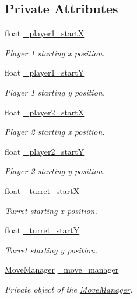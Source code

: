 \subsection*{Private Attributes}
\begin{DoxyCompactItemize}
\item 
float \hyperlink{classGame_ac3d9582803715a82b0aa03ddc9d9b7f6}{\-\_\-player1\-\_\-start\-X}
\begin{DoxyCompactList}\small\item\em Player 1 starting x position. \end{DoxyCompactList}\item 
float \hyperlink{classGame_ac86e7845910feac197a8396c9eedcae9}{\-\_\-player1\-\_\-start\-Y}
\begin{DoxyCompactList}\small\item\em Player 1 starting y position. \end{DoxyCompactList}\item 
float \hyperlink{classGame_ac3fb65efc81597149ea1c6951110f1b8}{\-\_\-player2\-\_\-start\-X}
\begin{DoxyCompactList}\small\item\em Player 2 starting x position. \end{DoxyCompactList}\item 
float \hyperlink{classGame_a62232949f4969880bad54622e180d9aa}{\-\_\-player2\-\_\-start\-Y}
\begin{DoxyCompactList}\small\item\em Player 2 starting y position. \end{DoxyCompactList}\item 
float \hyperlink{classGame_ad7a148e2de0c944863d8aaa78a075f74}{\-\_\-turret\-\_\-start\-X}
\begin{DoxyCompactList}\small\item\em \hyperlink{classTurret}{Turret} starting x position. \end{DoxyCompactList}\item 
float \hyperlink{classGame_ab875384f85be491849e480d7f91cfe93}{\-\_\-turret\-\_\-start\-Y}
\begin{DoxyCompactList}\small\item\em \hyperlink{classTurret}{Turret} starting y position. \end{DoxyCompactList}\item 
\hyperlink{classMoveManager}{Move\-Manager} \hyperlink{classGame_a2998c8ca6b641f19bca912c1aba2d54f}{\-\_\-move\-\_\-manager}
\begin{DoxyCompactList}\small\item\em Private object of the \hyperlink{classMoveManager}{Move\-Manager}. \end{DoxyCompactList}\item 

\end{DoxyCompactItemize}
